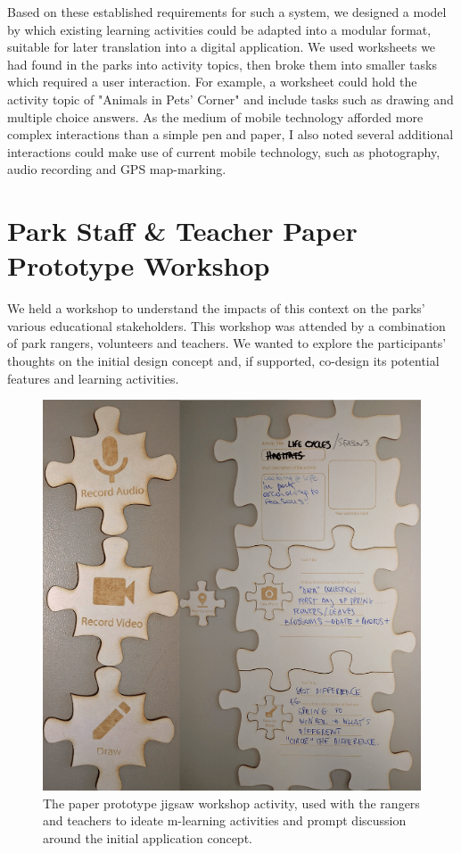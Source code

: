 Based on these established requirements for such a system, we designed a model by which existing learning activities could be adapted into a modular format, suitable for later translation into a digital application. We used worksheets we had found in the parks into activity topics, then broke them into smaller tasks which required a user interaction. For example, a worksheet could hold the activity topic of "Animals in Pets' Corner" and include tasks such as drawing and multiple choice answers. As the medium of mobile technology afforded more complex interactions than a simple pen and paper, I also noted several additional interactions could make use of current mobile technology, such as photography, audio recording and GPS map-marking.

\section{Park Staff \& Teacher Paper Prototype Workshop}
\label{sec:PrototypeWorkshop}

We held a workshop to understand the impacts of this context on the parks’ various educational stakeholders. This workshop was attended by a combination of park rangers, volunteers and teachers. We wanted to explore the participants’ thoughts on the initial design concept and, if supported, co-design its potential features and learning activities.

\begin{figure}
  \centering
  \includegraphics[width=0.8\columnwidth]{images/chapter04/rangerJigsaw.png}
  \caption[The jigsaw prototyping activity]{The paper prototype jigsaw workshop activity, used with the rangers and teachers to ideate m-learning activities and prompt discussion around the initial application concept.}
  \label{fig:rangerJigsaw}
\end{figure}

